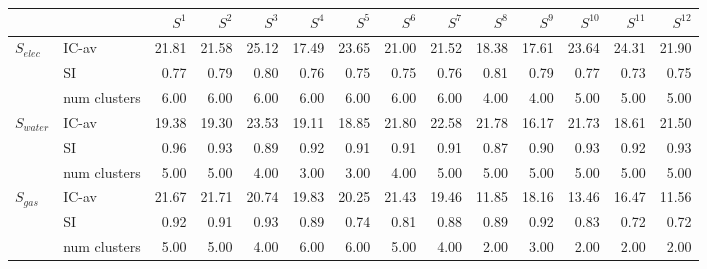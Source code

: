 \begin{tabular}{llrrrrrrrrrrrr}
\toprule
 &  & $S^{1}$ & $S^{2}$ & $S^{3}$ & $S^{4}$ & $S^{5}$ & $S^{6}$ & $S^{7}$ & $S^{8}$ & $S^{9}$ & $S^{10}$ & $S^{11}$ & $S^{12}$ \\
\midrule
\multirow[c]{3}{*}{$S_{elec}$} & IC-av & 21.81 & 21.58 & 25.12 & 17.49 & 23.65 & 21.00 & 21.52 & 18.38 & 17.61 & 23.64 & 24.31 & 21.90 \\
 & SI & 0.77 & 0.79 & 0.80 & 0.76 & 0.75 & 0.75 & 0.76 & 0.81 & 0.79 & 0.77 & 0.73 & 0.75 \\
 & num clusters & 6.00 & 6.00 & 6.00 & 6.00 & 6.00 & 6.00 & 6.00 & 4.00 & 4.00 & 5.00 & 5.00 & 5.00 \\
\multirow[c]{3}{*}{$S_{water}$} & IC-av & 19.38 & 19.30 & 23.53 & 19.11 & 18.85 & 21.80 & 22.58 & 21.78 & 16.17 & 21.73 & 18.61 & 21.50 \\
 & SI & 0.96 & 0.93 & 0.89 & 0.92 & 0.91 & 0.91 & 0.91 & 0.87 & 0.90 & 0.93 & 0.92 & 0.93 \\
 & num clusters & 5.00 & 5.00 & 4.00 & 3.00 & 3.00 & 4.00 & 5.00 & 5.00 & 5.00 & 5.00 & 5.00 & 5.00 \\
\multirow[c]{3}{*}{$S_{gas}$} & IC-av & 21.67 & 21.71 & 20.74 & 19.83 & 20.25 & 21.43 & 19.46 & 11.85 & 18.16 & 13.46 & 16.47 & 11.56 \\
 & SI & 0.92 & 0.91 & 0.93 & 0.89 & 0.74 & 0.81 & 0.88 & 0.89 & 0.92 & 0.83 & 0.72 & 0.72 \\
 & num clusters & 5.00 & 5.00 & 4.00 & 6.00 & 6.00 & 5.00 & 4.00 & 2.00 & 3.00 & 2.00 & 2.00 & 2.00 \\
\bottomrule
\end{tabular}
